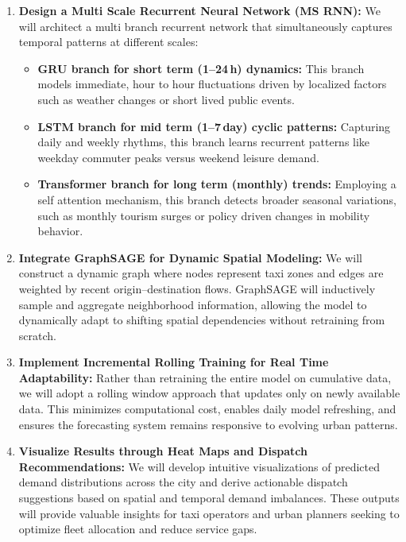 \documentclass{article}
\begin{document}
\begin{enumerate}
  \item \textbf{Design a Multi Scale Recurrent Neural Network (MS RNN):}  
  We will architect a multi branch recurrent network that simultaneously captures temporal patterns at different scales:
    \begin{itemize}
      \item \textbf{GRU branch for short term (1–24\,h) dynamics:} This branch models immediate, hour to hour fluctuations driven by localized factors such as weather changes or short lived public events.
      \item \textbf{LSTM branch for mid term (1–7\,day) cyclic patterns:} Capturing daily and weekly rhythms, this branch learns recurrent patterns like weekday commuter peaks versus weekend leisure demand.
      \item \textbf{Transformer branch for long term (monthly) trends:} Employing a self attention mechanism, this branch detects broader seasonal variations, such as monthly tourism surges or policy driven changes in mobility behavior.
    \end{itemize}
  \item \textbf{Integrate GraphSAGE for Dynamic Spatial Modeling:}  
  We will construct a dynamic graph where nodes represent taxi zones and edges are weighted by recent origin–destination flows. GraphSAGE will inductively sample and aggregate neighborhood information, allowing the model to dynamically adapt to shifting spatial dependencies without retraining from scratch.
  
  \item \textbf{Implement Incremental Rolling Training for Real Time Adaptability:}  
  Rather than retraining the entire model on cumulative data, we will adopt a rolling window approach that updates only on newly available data. This minimizes computational cost, enables daily model refreshing, and ensures the forecasting system remains responsive to evolving urban patterns.
  
  \item \textbf{Visualize Results through Heat Maps and Dispatch Recommendations:}  
  We will develop intuitive visualizations of predicted demand distributions across the city and derive actionable dispatch suggestions based on spatial and temporal demand imbalances. These outputs will provide valuable insights for taxi operators and urban planners seeking to optimize fleet allocation and reduce service gaps.
\end{enumerate}
\end{document}
